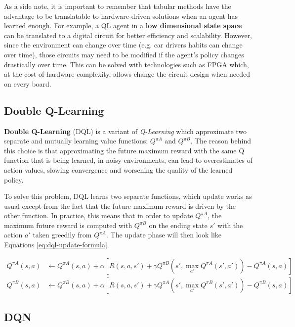 As a side note, it is important to remember that tabular methods have the advantage to be translatable to hardware-driven solutions when an agent has learned enough. For example, a QL agent in a \textbf{low dimensional state space} can be translated to a digital circuit for better efficiency and scalability. However, since the environment can change over time (e.g. car drivers habits can change over time), those circuits may need to be modified if the agent's policy changes drastically over time. This can be solved with technologies such as FPGA which, at the cost of hardware complexity, allows change the circuit design when needed on every board.

\subsection{Double Q-Learning}

\textbf{Double Q-Learning} (DQL) \cite{hasselt2010double} is a variant of \textit{Q-Learning} which approximate two separate and mutually learning value functions: $Q^{\pi A}$ and $Q^{\pi B}$. The reason behind this choice is that approximating the future maximum reward with the same Q function that is being learned, in noisy environments, can lead to overestimates of action values, slowing convergence and worsening the quality of the learned policy.

To solve this problem, DQL learns two separate functions, which update works as usual except from the fact that the future maximum reward is driven by the other function. In practice, this means that in order to update $Q^{\pi A}$, the maximum future reward is computed with $Q^{\pi B}$ on the ending state $s'$ with the action $a'$ taken greedily from $Q^{\pi A}$. The update phase will then look like Equations \ref{eq:dql-update-formula}.

\begin{equation}
  \label{eq:dql-update-formula}
  \begin{split}
    Q^{\pi A}(s, a) & \leftarrow Q^{\pi A}(s, a) + \alpha \left[ R(s, a, s') + \gamma Q^{\pi B}(s', \max_{a'} Q^{\pi A}(s', a')) - Q^{\pi A}(s, a) \right] \\
    Q^{\pi B}(s, a) & \leftarrow Q^{\pi B}(s, a) + \alpha \left[ R(s, a, s') + \gamma Q^{\pi A}(s', \max_{a'} Q^{\pi B}(s', a')) - Q^{\pi B}(s, a) \right]
  \end{split}
\end{equation}

\subsection{DQN}

